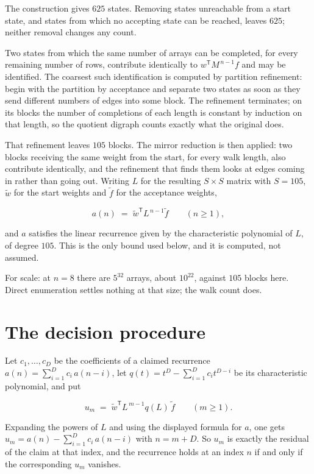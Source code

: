 \documentclass[11pt]{article}
\theoremstyle{definition}
\begin{document}
The construction gives $625$ states. Removing states unreachable from a start state, and states from which no accepting state can be reached, leaves $625$; neither removal changes any count.

Two states from which the same number of arrays can be completed, for every remaining number of rows, contribute identically to $w^{\mathsf T}M^{\,n-1}f$ and may be identified. The coarsest such identification is computed by partition refinement: begin with the partition by acceptance and separate two states as soon as they send different numbers of edges into some block. The refinement terminates; on its blocks the number of completions of each length is constant by induction on that length, so the quotient digraph counts exactly what the original does.

That refinement leaves $105$ blocks. The mirror reduction is then applied: two blocks receiving the same weight from the start, for every walk length, also contribute identically, and the refinement that finds them looks at edges coming in rather than going out. Writing $L$ for the resulting $S \times S$ matrix with $S = 105$, $\tilde w$ for the start weights and $\tilde f$ for the acceptance weights,

\[a(n) \;=\; \tilde w^{\mathsf T} L^{\,n-1} \tilde f \qquad (n \ge 1),\]

and $a$ satisfies the linear recurrence given by the characteristic polynomial of $L$, of degree $105$. This is the only bound used below, and it is computed, not assumed.

For scale: at $n = 8$ there are $5^{32}$ arrays, about $10^{22}$, against $105$ blocks here. Direct enumeration settles nothing at that size; the walk count does.

\section{The decision procedure}

Let $c_1,\dots,c_D$ be the coefficients of a claimed recurrence $a(n) = \sum_{i=1}^{D} c_i\,a(n-i)$, let $q(t) = t^{D} - \sum_{i=1}^{D} c_i t^{D-i}$ be its characteristic polynomial, and put

\[u_m \;=\; \tilde w^{\mathsf T} L^{\,m-1} q(L)\,\tilde f \qquad (m \ge 1).\]

Expanding the powers of $L$ and using the displayed formula for $a$, one gets $u_m = a(n) - \sum_{i=1}^{D} c_i\,a(n-i)$ with $n = m + D$. So $u_m$ is exactly the residual of the claim at that index, and the recurrence holds at an index $n$ if and only if the corresponding $u_m$ vanishes.
\end{document}

